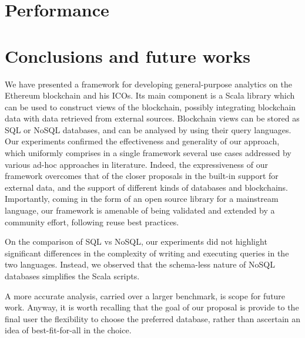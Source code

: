 \section{Performance}

\section{Conclusions and future works}
We have presented a framework for developing general-purpose analytics on the Ethereum blockchain and his ICOs. Its main component is a Scala library which can be used to construct views of the blockchain, possibly integrating blockchain data with data retrieved from external sources. Blockchain views can be stored as SQL or NoSQL databases, and can be analysed by using their query languages. Our experiments confirmed the effectiveness and generality of our approach, which uniformly comprises in a single framework several use cases addressed by various ad-hoc approaches in literature. Indeed, the expressiveness of our framework overcomes that of the closer proposals in the built-in support for external data, and the support of different kinds of databases and blockchains.
Importantly, coming in the form of an open source library for a mainstream language, our framework is amenable of being validated and extended by a community effort, following reuse best practices.

On the comparison of SQL vs NoSQL, our experiments did not highlight significant differences in the complexity of writing and executing queries in the two languages. Instead, we observed that the schema-less nature of NoSQL databases simplifies the Scala scripts.

A more accurate analysis, carried over a larger benchmark, is scope for future work. Anyway, it is worth recalling that the goal of our proposal is provide to the final user the flexibility to choose the preferred database, rather than ascertain an idea of best-fit-for-all in the choice.